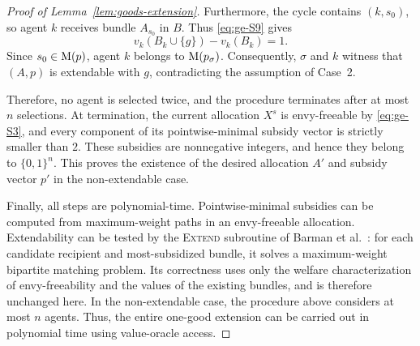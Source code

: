\begin{proof}[Proof of Lemma~\ref{lem:goods-extension}]
Furthermore, the cycle contains $(k,s_0)$, so agent $k$ receives bundle $A_{s_0}$
in $B$. Thus \eqref{eq:ge-S9} gives
\[
  v_k(B_k\cup\{g\})-v_k(B_k)=1.
\]
Since $s_0\in \mathrm{M}(p)$, agent $k$ belongs to $\mathrm{M}(p_\sigma)$. Consequently,
$\sigma$ and $k$ witness that $(A,p)$ is extendable with $g$, contradicting the
assumption of Case~2.

Therefore, no agent is selected twice, and the procedure terminates after at most
$n$ selections. At termination, the current allocation $X^s$ is envy-freeable by
\eqref{eq:ge-S3}, and every component of its pointwise-minimal subsidy vector is
strictly smaller than $2$. These subsidies are nonnegative integers, and hence
they belong to $\{0,1\}^n$. This proves the existence of the desired allocation
$A'$ and subsidy vector $p'$ in the non-extendable case.

Finally, all steps are polynomial-time. Pointwise-minimal subsidies can be
computed from maximum-weight paths in an envy-freeable allocation. Extendability
can be tested by the \textsc{Extend} subroutine of Barman et al.~\cite{BKNS22}:
for each candidate recipient and most-subsidized bundle, it solves a
maximum-weight bipartite matching problem. Its correctness uses only the welfare
characterization of envy-freeability and the values of the existing bundles, and
is therefore unchanged here. In the non-extendable case, the procedure above
considers at most $n$ agents. Thus, the entire one-good extension can be carried
out in polynomial time using value-oracle access.
\end{proof}
